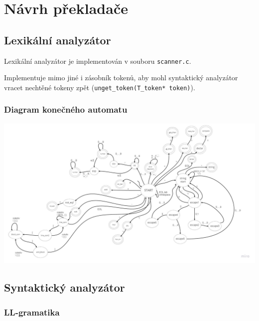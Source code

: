 \documentclass[a4paper]{article}
\theoremstyle{definition}
\begin{document}
\newpage

\section{Návrh překladače}



\subsection{Lexikální analyzátor}

Lexikální analyzátor je implementován v souboru \texttt{scanner.c}.

Implementuje mimo jiné i zásobník tokenů, aby mohl syntaktický analyzátor vracet nechtěné tokeny zpět (\texttt{unget\_token(T\_token* token)}).

\subsubsection{Diagram konečného automatu}

\includegraphics[width=\linewidth]{inc/automaton.pdf}

\subsection{Syntaktický analyzátor}

\subsubsection{LL-gramatika}
\end{document}

